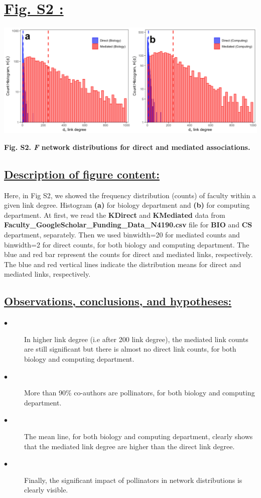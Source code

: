 \documentclass{article}\usepackage[]{graphicx}\usepackage[]{color}
\begin{document}
\section*{\underline{Fig. S2 :}}
\begin{center}
\includegraphics[scale=0.45]{S2.png}
\newline
\par{\textbf{Fig. S2. \textit{F} network distributions for direct and mediated associations.}}
\end{center}
\subsection*{\underline{Description of figure content:}}
\par{Here, in Fig S2, we showed the frequency distribution (counts) of faculty within a given link degree. Histogram \textbf{(a)} for biology department and \textbf{(b)} for computing department. At first, we read the \textbf{KDirect} and \textbf{KMediated} data from \textbf{Faculty\_GoogleScholar\_Funding\_Data\_N4190.csv} file for \textbf{BIO} and \textbf{CS} department, separately. Then we used binwidth=20 for mediated counts and binwidth=2 for direct counts, for both biology and computing department. The blue and red bar represent the counts for direct and mediated links, respectively. The blue and red vertical lines indicate the distribution means for direct and mediated links, respectively.}
\subsection*{\underline{Observations, conclusions, and hypotheses:}}
\begin{description}
  \item[$\bullet$] In higher link degree (i.e after 200 link degree), the mediated link counts are still significant but there is almost no direct link counts, for both biology and computing department. 
  \item[$\bullet$] More than 90\% co-authors are pollinators, for both biology and computing department. 
  \item[$\bullet$] The mean line, for both biology and computing department, clearly shows that the mediated link degree are higher than the direct link degree. 
  \item[$\bullet$] Finally, the significant impact of pollinators in network distributions is clearly visible.
\end{description}
\end{document}
